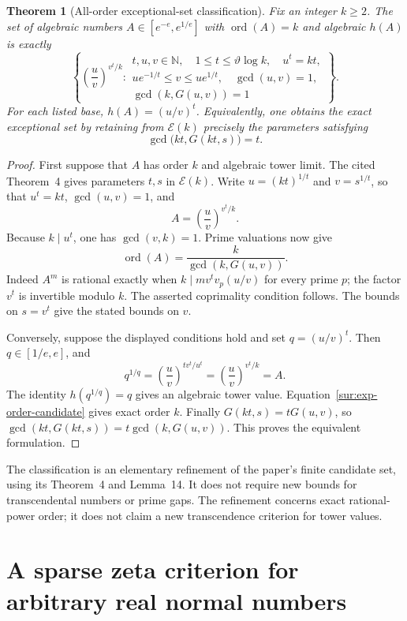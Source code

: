 \documentclass[11pt,a4paper]{article}
\newtheorem{theorem}{Theorem}[section]
\theoremstyle{definition}
\theoremstyle{remark}
\numberwithin{equation}{section}
\begin{document}
\begin{theorem}[All-order exceptional-set classification]\label{sur:exp-classification}
Fix an integer $k\ge2$. The set of algebraic numbers
$A\in[e^{-e},e^{1/e}]$ with $\operatorname{ord}(A)=k$ and algebraic
$h(A)$ is exactly
\[
 \left\{\left(\frac uv\right)^{v^t/k}:
 \begin{array}{l}
 t,u,v\in\mathbb N,\quad 1\le t\le\vartheta\log k,\quad u^t=kt,\\
 ue^{-1/t}\le v\le ue^{1/t},\quad\gcd(u,v)=1,\\
 \gcd(k,G(u,v))=1
 \end{array}\right\}.
\]
For each listed base, $h(A)=(u/v)^t$.
Equivalently, one obtains the exact exceptional set by retaining from
$\mathcal E(k)$ precisely the parameters satisfying
\[
 \gcd\bigl(kt,G(kt,s)\bigr)=t.
\]
\end{theorem}
\begin{proof}
First suppose that $A$ has order $k$ and algebraic tower limit.
The cited Theorem~4 gives parameters $t,s$ in $\mathcal E(k)$.
Write $u=(kt)^{1/t}$ and $v=s^{1/t}$, so that
$u^t=kt$, $\gcd(u,v)=1$, and
\[
 A=\left(\frac uv\right)^{v^t/k}.
\]
Because $k\mid u^t$, one has $\gcd(v,k)=1$. Prime valuations now give
\begin{equation}\label{sur:exp-order-candidate}
 \operatorname{ord}(A)=\frac{k}{\gcd(k,G(u,v))}.
\end{equation}
Indeed $A^m$ is rational exactly when
$k\mid mv^t v_p(u/v)$ for every prime $p$; the factor $v^t$ is
invertible modulo $k$. The asserted coprimality condition follows.
The bounds on $s=v^t$ give the stated bounds on $v$.

Conversely, suppose the displayed conditions hold and set
$q=(u/v)^t$. Then $q\in[1/e,e]$, and
\[
 q^{1/q}
  =\left(\frac uv\right)^{t v^t/u^t}
  =\left(\frac uv\right)^{v^t/k}=A.
\]
The identity $h(q^{1/q})=q$ gives an algebraic tower value.
Equation~\eqref{sur:exp-order-candidate} gives exact order $k$.
Finally $G(kt,s)=tG(u,v)$, so
$\gcd(kt,G(kt,s))=t\gcd(k,G(u,v))$.
This proves the equivalent formulation.
\end{proof}

The classification is an elementary refinement of the paper's finite
candidate set, using its Theorem~4 and Lemma~14. It does not require new
bounds for transcendental numbers or prime gaps. The refinement concerns exact rational-power order; it does not claim
a new transcendence criterion for tower values.


\section{A sparse zeta criterion for arbitrary real normal numbers}
\end{document}
